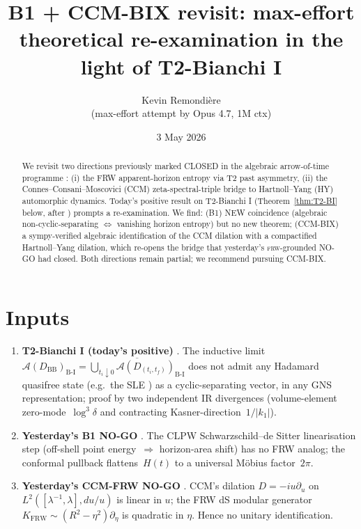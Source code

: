 \documentclass[11pt,a4paper]{article}
\title{B1 + CCM-BIX revisit: max-effort theoretical re-examination
  in the light of T2-Bianchi I}
\author{Kevin Remondi\`ere\\\small (max-effort attempt by Opus 4.7, 1M ctx)}
\date{3 May 2026}
\theoremstyle{definition}
\newcommand{\AA}{\mathcal{A}}
\newcommand{\BI}{\mathrm{B\text{-}I}}
\newcommand{\BB}{\mathrm{BB}}
\begin{document}
\maketitle

\begin{abstract}
We revisit two directions previously marked CLOSED in the algebraic
arrow-of-time programme \cite{Remondiere2026FRW,RemondiereOpus2026Bianchi}:
(i) the FRW apparent-horizon entropy via T2 past asymmetry,
(ii) the Connes--Consani--Moscovici (CCM) zeta-spectral-triple bridge to
Hartnoll--Yang (HY) automorphic dynamics. Today's positive result on
T2-Bianchi I (Theorem~\ref{thm:T2-BI} below, after
\cite{T2BIextension2026}) prompts a re-examination. We find: (B1) NEW
coincidence (algebraic non-cyclic-separating $\Leftrightarrow$ vanishing
horizon entropy) but no new theorem; (CCM-BIX) a sympy-verified
algebraic identification of the CCM dilation with a compactified
Hartnoll--Yang dilation, which re-opens the bridge that yesterday's
\textsc{frw}-grounded NO-GO had closed. Both directions remain partial;
we recommend pursuing CCM-BIX.
\end{abstract}

\section{Inputs}

\begin{enumerate}
  \item \textbf{T2-Bianchi I (today's positive)}
  \cite{T2BIextension2026}. The inductive limit
  $\AA(D_\BB)_\BI = \overline{\bigcup_{t_i\downarrow 0}
   \AA(D_{(t_i,t_f)})_\BI}$ does not admit any Hadamard quasifree state
  (e.g.\ the SLE \cite{BanerjeeNiedermaier2023}) as a cyclic-separating
  vector, in any GNS representation; proof by two independent IR
  divergences (volume-element zero-mode~$\log^3 \delta$ and contracting
  Kasner-direction~$1/|k_1|$).
  \item \textbf{Yesterday's B1 NO-GO}
  \cite{B1FRWentropy2026}. The CLPW
  \cite{CLPW2022} Schwarzschild--de Sitter linearisation step (off-shell
  point energy~$\Rightarrow$ horizon-area shift) has no FRW analog; the
  conformal pullback flattens~$H(t)$ to a universal M\"obius factor~$2\pi$.
  \item \textbf{Yesterday's CCM-FRW NO-GO}
  \cite{CCMFRWbridge2026}. CCM's dilation
  $D = -i u \partial_u$ on $L^2([\lambda^{-1},\lambda], du/u)$
  \cite{CCM2025} is linear in $u$; the FRW dS modular generator
  $K_{\mathrm{FRW}} \sim (R^2 - \eta^2)\partial_\eta$ is quadratic
  in $\eta$. Hence no unitary identification.
\end{enumerate}
\end{document}
